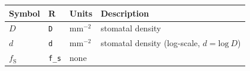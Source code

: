 \documentclass[utf8]{frontiersSCNS}
\newcommand{\fs}{$f_\text{S}$}
\begin{document}
\begin{longtable}[]{@{}llll@{}}
\toprule
\begin{minipage}[b]{0.09\columnwidth}\raggedright
Symbol\strut
\end{minipage} & \begin{minipage}[b]{0.09\columnwidth}\raggedright
R\strut
\end{minipage} & \begin{minipage}[b]{0.11\columnwidth}\raggedright
Units\strut
\end{minipage} & \begin{minipage}[b]{0.59\columnwidth}\raggedright
Description\strut
\end{minipage}\tabularnewline
\midrule
\endhead
\begin{minipage}[t]{0.09\columnwidth}\raggedright
\(D\)\strut
\end{minipage} & \begin{minipage}[t]{0.09\columnwidth}\raggedright
\texttt{D}\strut
\end{minipage} & \begin{minipage}[t]{0.11\columnwidth}\raggedright
\(\textrm{mm}^{-2}\)\strut
\end{minipage} & \begin{minipage}[t]{0.59\columnwidth}\raggedright
stomatal density\strut
\end{minipage}\tabularnewline
\begin{minipage}[t]{0.09\columnwidth}\raggedright
\(d\)\strut
\end{minipage} & \begin{minipage}[t]{0.09\columnwidth}\raggedright
\texttt{d}\strut
\end{minipage} & \begin{minipage}[t]{0.11\columnwidth}\raggedright
\(\textrm{mm}^{-2}\)\strut
\end{minipage} & \begin{minipage}[t]{0.59\columnwidth}\raggedright
stomatal density (log-scale, \(d = \text{log}~D\))\strut
\end{minipage}\tabularnewline
\begin{minipage}[t]{0.09\columnwidth}\raggedright
\fs\strut
\end{minipage} & \begin{minipage}[t]{0.09\columnwidth}\raggedright
\texttt{f\_s}\strut
\end{minipage} & \begin{minipage}[t]{0.11\columnwidth}\raggedright
none\strut
\end{minipage} & \begin{minipage}[t]{0.59\columnwidth}\raggedright

\end{minipage}
\end{longtable}
\end{document}
